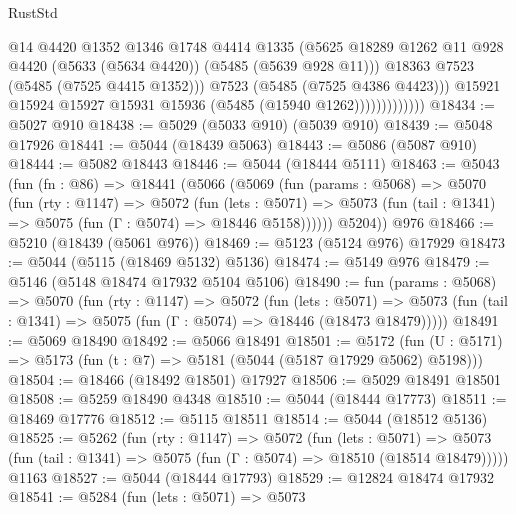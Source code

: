 \begin{lexlean}{RustStd}
\begin{coremodule}
                              @14
                              @4420
                              @1352
                              @1346
                              @1748
                              @4414
                              @1335
                              (@5625
                                @18289
                                @1262
                                @11
                                @928
                                @4420
                                (@5633 (@5634 @4420))
                                (@5485 (@5639 @928 @11)))
                              @18363
                              @7523
                              (@5485 (@7525 @4415 @1352)))
                            @7523
                            (@5485 (@7525 @4386 @4423)))
                          @15921
                          @15924
                          @15927
                          @15931
                          @15936
                          (@5485 (@15940 @1262)))))))))))))
@18434 := @5027 @910
@18438 := @5029 (@5033 @910) (@5039 @910)
@18439 := @5048 @17926
@18441 := @5044 (@18439 @5063)
@18443 := @5086 (@5087 @910)
@18444 := @5082 @18443
@18446 := @5044 (@18444 @5111)
@18463 := @5043
    (fun (fn : @86) =>
    @18441
      (@5066
        (@5069
          (fun (params : @5068) =>
          @5070
            (fun (rty : @1147) =>
            @5072
              (fun (lets : @5071) =>
              @5073 (fun (tail : @1341) => @5075 (fun (Γ : @5074) => @18446 @5158))))))
        @5204))
    @976
@18466 := @5210 (@18439 (@5061 @976))
@18469 := @5123 (@5124 @976) @17929
@18473 := @5044 (@5115 (@18469 @5132) @5136)
@18474 := @5149 @976
@18479 := @5146 (@5148 @18474 @17932 @5104 @5106)
@18490 := fun (params : @5068) =>
  @5070
    (fun (rty : @1147) =>
    @5072
      (fun (lets : @5071) =>
      @5073 (fun (tail : @1341) => @5075 (fun (Γ : @5074) => @18446 (@18473 @18479)))))
@18491 := @5069 @18490
@18492 := @5066 @18491
@18501 := @5172
    (fun (U : @5171) => @5173 (fun (t : @7) => @5181 (@5044 (@5187 @17929 @5062) @5198)))
@18504 := @18466 (@18492 @18501) @17927
@18506 := @5029 @18491 @18501
@18508 := @5259 @18490 @4348
@18510 := @5044 (@18444 @17773)
@18511 := @18469 @17776
@18512 := @5115 @18511
@18514 := @5044 (@18512 @5136)
@18525 := @5262
    (fun (rty : @1147) =>
    @5072
      (fun (lets : @5071) =>
      @5073 (fun (tail : @1341) => @5075 (fun (Γ : @5074) => @18510 (@18514 @18479)))))
    @1163
@18527 := @5044 (@18444 @17793)
@18529 := @12824 @18474 @17932
@18541 := @5284
    (fun (lets : @5071) =>
    @5073

\end{coremodule}
\end{lexlean}
